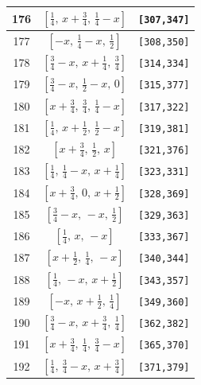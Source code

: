 \documentclass[fleqn,8pt]{jsarticle}
\begin{document}
\begin{longtable}{ccc}
176 & $\left[ \frac{1}{4},\, x + \frac{3}{4},\, \frac{1}{4} - x \right]$ & {\tt [307,347]} \\ \hline
177 & $\left[ - x,\, \frac{1}{4} - x,\, \frac{1}{2} \right]$ & {\tt [308,350]} \\ \hline
178 & $\left[ \frac{3}{4} - x,\, x + \frac{1}{4},\, \frac{3}{4} \right]$ & {\tt [314,334]} \\ \hline
179 & $\left[ \frac{3}{4} - x,\, \frac{1}{2} - x,\, 0 \right]$ & {\tt [315,377]} \\ \hline
180 & $\left[ x + \frac{3}{4},\, \frac{3}{4},\, \frac{1}{4} - x \right]$ & {\tt [317,322]} \\ \hline
181 & $\left[ \frac{1}{4},\, x + \frac{1}{2},\, \frac{1}{2} - x \right]$ & {\tt [319,381]} \\ \hline
182 & $\left[ x + \frac{3}{4},\, \frac{1}{2},\, x \right]$ & {\tt [321,376]} \\ \hline
183 & $\left[ \frac{1}{4},\, \frac{1}{4} - x,\, x + \frac{1}{4} \right]$ & {\tt [323,331]} \\ \hline
184 & $\left[ x + \frac{3}{4},\, 0,\, x + \frac{1}{2} \right]$ & {\tt [328,369]} \\ \hline
185 & $\left[ \frac{3}{4} - x,\, - x,\, \frac{1}{2} \right]$ & {\tt [329,363]} \\ \hline
186 & $\left[ \frac{1}{4},\, x,\, - x \right]$ & {\tt [333,367]} \\ \hline
187 & $\left[ x + \frac{1}{2},\, \frac{1}{4},\, - x \right]$ & {\tt [340,344]} \\ \hline
188 & $\left[ \frac{1}{4},\, - x,\, x + \frac{1}{2} \right]$ & {\tt [343,357]} \\ \hline
189 & $\left[ - x,\, x + \frac{1}{2},\, \frac{1}{4} \right]$ & {\tt [349,360]} \\ \hline
190 & $\left[ \frac{3}{4} - x,\, x + \frac{3}{4},\, \frac{1}{4} \right]$ & {\tt [362,382]} \\ \hline
191 & $\left[ x + \frac{3}{4},\, \frac{1}{4},\, \frac{3}{4} - x \right]$ & {\tt [365,370]} \\ \hline
192 & $\left[ \frac{1}{4},\, \frac{3}{4} - x,\, x + \frac{3}{4} \right]$ & {\tt [371,379]} \\
\end{longtable}
\renewcommand{\arraystretch}{1.2}
\end{document}
